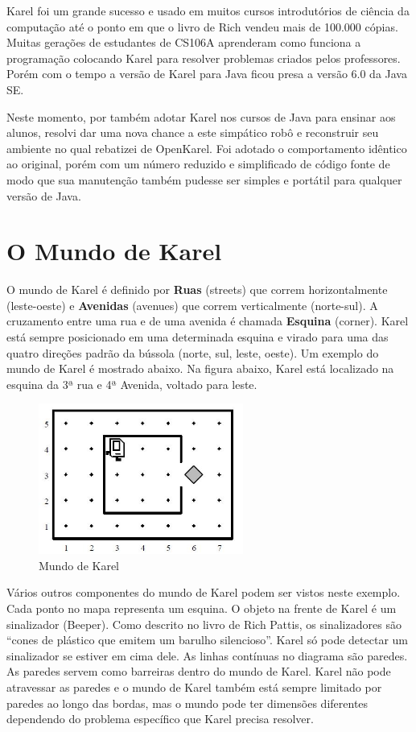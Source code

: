 \documentclass[a4paper,11pt]{article}
\begin{document}
Karel foi um grande sucesso e usado em muitos cursos introdutórios de ciência da computação até o ponto em que o livro de Rich vendeu mais de 100.000 cópias. Muitas gerações de estudantes de CS106A\cite{cs106a} aprenderam como funciona a programação colocando Karel para resolver problemas criados pelos professores. Porém com o tempo a versão de Karel para Java ficou presa a versão 6.0 da Java SE.

Neste momento, por também adotar Karel nos cursos de Java para ensinar aos alunos, resolvi dar uma nova chance a este simpático robô e reconstruir seu ambiente no qual rebatizei de OpenKarel\cite{openkareloficial}. Foi adotado o comportamento idêntico ao original, porém com um número reduzido e simplificado de código fonte de modo que sua manutenção também pudesse ser simples e portátil para qualquer versão de Java.

\section{O Mundo de Karel}
O mundo de Karel é definido por \textbf{Ruas} (streets) que correm horizontalmente (leste-oeste) e \textbf{Avenidas} (avenues) que correm verticalmente (norte-sul). A cruzamento entre uma rua e de uma avenida é chamada \textbf{Esquina} (corner). Karel está sempre posicionado em uma determinada esquina e virado para uma das quatro direções padrão da bússola (norte, sul, leste, oeste). Um exemplo do mundo de Karel é mostrado abaixo. Na figura abaixo, Karel está localizado na esquina da 3ª rua e 4ª Avenida, voltado para leste.
\begin{figure}[H]
	\centering
	\includegraphics[width=0.6\textwidth]{imagem/mundo.jpg}
	\caption{Mundo de Karel}
\end{figure}

Vários outros componentes do mundo de Karel podem ser vistos neste exemplo. Cada ponto no mapa representa um esquina. O objeto na frente de Karel é um sinalizador (Beeper). Como descrito no livro de Rich Pattis, os sinalizadores são ``cones de plástico que emitem um barulho silencioso''. Karel só pode detectar um sinalizador se estiver em cima dele. As linhas contínuas no diagrama são paredes. As paredes servem como barreiras dentro do mundo de Karel. Karel não pode atravessar as paredes e o mundo de Karel também está sempre limitado por paredes ao longo das bordas, mas o mundo pode ter dimensões diferentes dependendo do problema específico que Karel precisa resolver.
\end{document}
